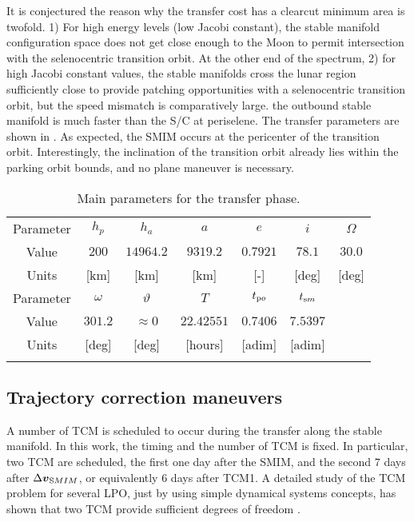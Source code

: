 It is conjectured the reason why the transfer cost has a clearcut minimum area is twofold. 1) For high energy levels (\ie low Jacobi constant), the stable manifold configuration space does not get close enough to the Moon to permit intersection with the selenocentric transition orbit. At the other end of the spectrum, 2) for high Jacobi constant values, the stable manifolds cross the lunar region sufficiently close to provide patching opportunities with a selenocentric transition orbit, but the speed mismatch is comparatively large. \ie the outbound stable manifold is much faster than the S/C at periselene. The transfer parameters are shown in . As expected, the {SMIM} occurs at the pericenter of the transition orbit. Interestingly, the inclination of the transition orbit already lies within the parking orbit bounds, and no plane maneuver is necessary.
%
\begin{table}[h!]
	\caption{Main parameters for the transfer phase.}
	\label{tab:TranferParameters}
	\centering
	\begin{tabular}{ccccccc}
		\TOPlines
		Parameter & $h_p$ & $h_a$ & $a$ & $e$ & $i$ & $\Omega$ \\
		Value & $200$ & $14964.2$ & $9319.2$ & $0.7921$ & $78.1$ & $30.0$ \\ 
		Units & [km] & [km] & [km] & [-] & [deg] & [deg] \\
		\MIDline
		Parameter & $\omega$ & $\vartheta$ & $T$ & $t_{\textrm po}$ & $t_{\textrm sm}$ & \\
		Value & $301.2$ & $\approx0$ & $22.42551$ & $0.7406$ & $7.5397$ & \\
		Units & [deg] & [deg] & [hours] & [adim] & [adim] & \\
		\BOTTOMlines
	\end{tabular}
\end{table}
%

\subsection[Trajectory correction maneuvers]{Trajectory correction maneuvers}\label{subsec:Monte Carlo analysis for TCMs scheduling}
A number of {TCM} is scheduled to occur during the transfer along the stable manifold. In this work, the timing and the number of {TCM} is fixed. In particular, two {TCM} are scheduled, the first one day after the {SMIM}, and the second $7$ days after $\Delta\boldsymbol{v}_{\textrm SMIM}$, or equivalently $6$ days after TCM1. A detailed study of the TCM problem for several {LPO}, just by using simple dynamical systems concepts, has shown that two {TCM} provide sufficient degrees of freedom \cite{gomez2005TCM}.

